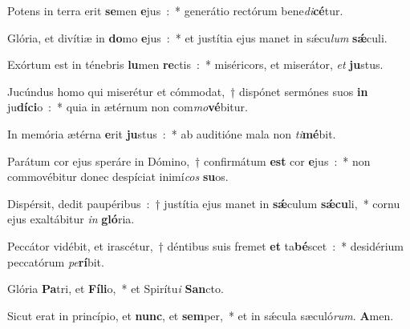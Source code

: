 ﻿\item Potens in terra erit \textbf{se}\-men \textbf{e}jus~:~* generátio rectórum bene\textit{di}\textbf{cé}tur.
\item Glória, et divítiæ in \textbf{do}\-mo \textbf{e}jus~:~* et justítia ejus manet in sǽcu\-\textit{lum} \textbf{sǽ}culi.
\item Exórtum est in ténebris \textbf{lu}\-men \textbf{re}\-ctis~:~* miséricors, et miserátor, \textit{et} \textbf{ju}stus.
\item Jucúndus homo qui miserétur et cómmodat,~† dispónet sermónes suos \textbf{in} ju\textbf{dí}\-\textbf{ci}\-o~:~* quia in ætérnum non com\textit{mo}\textbf{vé}bitur.
\item In memória ætérna \textbf{e}\-rit \textbf{ju}\-stus~:~* ab auditióne mala non \textit{ti}\textbf{mé}bit.
\item Parátum cor ejus speráre in Dómino,~† confirmátum \textbf{est} cor \textbf{e}jus~:~* non commovébitur donec despíciat inimí\textit{cos} \textbf{su}os.
\item Dispérsit, dedit pau\-pé\-ri\-bus~:~† justítia ejus manet in \textbf{sǽ}\-culum \textbf{sǽ}\-\textbf{cu}\-li,~* cornu ejus exaltábitur \textit{in} \textbf{gló}ria.
\item Peccátor vidébit, et irascétur,~† déntibus suis fremet \textbf{et} ta\textbf{bé}\-scet~:~* desidérium peccatórum \textit{pe}\textbf{rí}bit.
\item Glória \textbf{Pa}\-tri, et \textbf{Fí}\-\textbf{li}\-o,~* et Spirítu\-\textit{i} \textbf{San}cto.
\item Sicut erat in princípio, et \textbf{nunc}, et \textbf{sem}\-per,~* et in sǽcula sæculó\-\textit{rum}. \textbf{A}men.